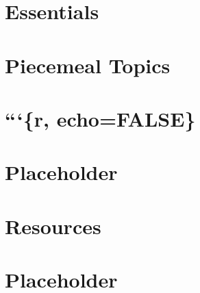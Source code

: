 \documentclass[]{book}
\begin{document}
\chapter{Essentials}\label{essentials}

\chapter{Piecemeal Topics}\label{piecemeal-top}

\chapter{```\{r, echo=FALSE\}}\label{r-echofalse}

\chapter{Placeholder}\label{placeholder}

\chapter{Resources}\label{resources}

\chapter{Placeholder}\label{placeholder-1}


\end{document}
